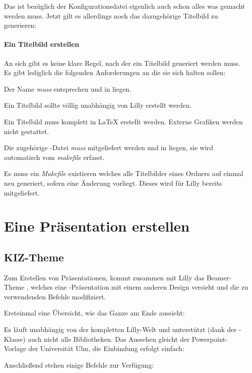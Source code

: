 Das ist bezüglich der Konfigurationsdatei eigenlich auch schon alles was gemacht werden muss. Jetzt gilt es allerdings noch das dazugehörige Titelbild zu generieren:

\paragraph{Ein Titelbild erstellen}
An sich gibt es keine klare Regel, nach der ein Titelbild generiert werden muss. Es gibt lediglich die folgenden Anforderungen an die sie sich halten sollen:
\begin{ditemize}
    \item Der Name \emph{muss}  entsprechen und in  liegen.
    \item Ein Titelbild sollte völlig unabhängig von Lilly erstellt werden.
    \item Ein Titelbild muss komplett in \LaTeX{} erstellt werden. Externe Grafiken werden nicht gestattet.
    \item Die zugehörige -Datei \emph{muss} mitgeliefert werden und in  liegen, sie wird automatisch vom \emph{makefile} erfasst.
    \item Es muss ein \emph{Makefile} existieren welches alle Titelbilder eines Ordners auf einmal neu generiert, sofern eine Änderung vorliegt. Dieses wird für Lilly bereits mitgeliefert.
\end{ditemize}

\section{Eine Präsentation erstellen}
\subsection{KIZ-Theme}
Zum Erstellen von Präsentationen, kommt zusammen mit Lilly das Beamer-Theme , welches eine -Präsentation mit einem anderen Design versieht und die zu verwendenden Befehle modifiziert.
\begin{example}
    Ersteinmal eine Übersicht, wie das Ganze am Ende aussieht:
    \begin{tcbraster}[raster columns=3, blankest, graphics pages={1,4,5}, colback=white]
    \end{tcbraster}
\end{example}
Es läuft unabhängig von der kompletten Lilly-Welt und unterstützt (dank der -Klasse) auch nicht alle Bibliotheken. Das Aussehen gleicht der Powerpoint-Vorlage der Universität Ulm, die Einbindung erfolgt einfach:
Anschließend stehen einige Befehle zur Verfügung:

